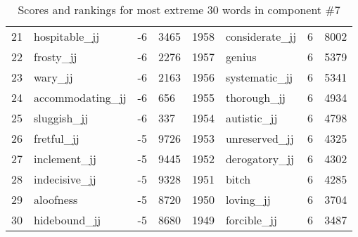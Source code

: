 \begin{table}[tbp]
\begin{tabular}{| rlr@{.}l | rlr@{.}l |}
    21 & hospitable\_jj & -6 & 3465    &    1958 & considerate\_jj & 6 & 8002 \\
    22 & frosty\_jj & -6 & 2276    &    1957 & genius & 6 & 5379 \\
    23 & wary\_jj & -6 & 2163    &    1956 & systematic\_jj & 6 & 5341 \\
    24 & accommodating\_jj & -6 & 656    &    1955 & thorough\_jj & 6 & 4934 \\
    25 & sluggish\_jj & -6 & 337    &    1954 & autistic\_jj & 6 & 4798 \\
    26 & fretful\_jj & -5 & 9726    &    1953 & unreserved\_jj & 6 & 4325 \\
    27 & inclement\_jj & -5 & 9445    &    1952 & derogatory\_jj & 6 & 4302 \\
    28 & indecisive\_jj & -5 & 9328    &    1951 & bitch & 6 & 4285 \\
    29 & aloofness & -5 & 8720    &    1950 & loving\_jj & 6 & 3704 \\
    30 & hidebound\_jj & -5 & 8680    &    1949 & forcible\_jj & 6 & 3487 \\
    \hline
    \end{tabular}
    \caption{Scores and rankings for most extreme 30 words in component \#7} 
\end{table}
\clearpage
